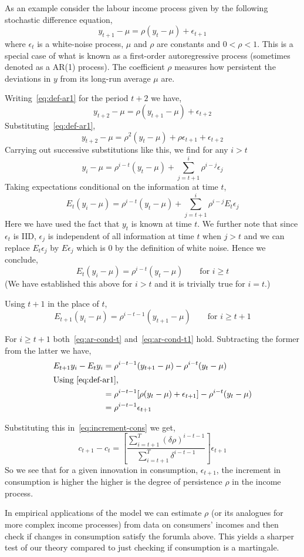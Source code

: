 \documentclass[12pt,reqno]{amsart}
\begin{document}
As an example consider the labour income process given by the
following stochastic difference equation,
\begin{equation}\label{eq:def-ar1}
y_{t+1}-\mu=\rho(y_t-\mu)+\epsilon_{t+1}
\end{equation}
where $\epsilon_t$ is a white-noise process, $\mu$ and $\rho$ are
constants and $0 < \rho <1$. This is a special case of what is known
as a first-order autoregressive process (sometimes denoted as a AR(1)
process). The coefficient $\rho$ measures how persistent the
deviations in $y$ from its long-run average $\mu$ are.

Writing~\eqref{eq:def-ar1} for the period $t+2$ we have,
\[y_{t+2}-\mu=\rho(y_{t+1}-\mu)+\epsilon_{t+2}\]
Substituting~\eqref{eq:def-ar1},
\[y_{t+2}-\mu=\rho^2(y_t-\mu)+\rho\epsilon_{t+1}+\epsilon_{t+2}\]
Carrying out successive substitutions like this, we find for any
$i>t$
\[y_i-\mu = \rho^{i-t}(y_t-\mu)+\sum_{j=t+1}^i \rho^{i-j} \epsilon_j\]
Taking expectations conditional on the information at time $t$,
\[E_t(y_i-\mu) = \rho^{i-t}(y_t-\mu)+\sum_{j=t+1}^i \rho^{i-j}
E_t\epsilon_j\]
Here we have used the fact that $y_t$ is known at time $t$. We
further note that since $\epsilon_t$ is IID, $\epsilon_j$ is
independent of all information at time $t$ when $j>t$ and we can
replace $E_t \epsilon_j$ by $E \epsilon_j$ which is $0$ by the
definition of white noise. Hence we conclude,
\begin{equation}\label{eq:ar-cond-t}
E_t(y_i-\mu) = \rho^{i-t}(y_t-\mu) \qquad \text{for $i \geq t$}
\end{equation}
(We have established this above for $i>t$ and it is trivially true for
$i=t$.)

Using $t+1$ in the place of $t$,
\begin{equation}\label{eq:ar-cond-t1}
E_{t+1}(y_i-\mu) = \rho^{i-t-1}(y_{t+1}-\mu) \qquad \text{for $i \geq t+1$}
\end{equation}

For $i\geq t+1$ both~\eqref{eq:ar-cond-t} and~\eqref{eq:ar-cond-t1}
hold. Subtracting the former from the latter we have,
\begin{align*}
E_{t+1} y_i - E_t y_i &=
\rho^{i-t-1}(y_{t+1}-\mu)-\rho^{i-t}(y_t-\mu)\\
\intertext{Using~\eqref{eq:def-ar1},}
&=\rho^{i-t-1}[\rho(y_t-\mu)+\epsilon_{t+1}]-\rho^{i-t}(y_t-\mu)\\
&=\rho^{i-t-1}\epsilon_{t+1}
\end{align*}

Substituting this in~\eqref{eq:increment-cons} we get,
\[c_{t+1}-c_t=\left[\frac{\sum_{i=t+1}^T(\delta\rho)^{i-t-1}}
{\sum_{i=t+1}^T \delta^{i-t-1}}\right]\epsilon_{t+1}\]
So we see that for a given innovation in consumption,
$\epsilon_{t+1}$, the increment in consumption is higher the higher is
the degree of persistence $\rho$ in the income process.

In empirical applications of the model we can estimate $\rho$ (or its
analogues for more complex income processes) from
data on consumers' incomes  and then check if changes in consumption
satisfy the forumla above. This yields a sharper test of our theory
compared to just checking if consumption is a martingale.
\end{document}
